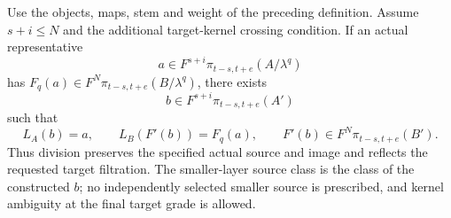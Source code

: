 \begin{theorem}
\label{sem:ProofTools:finite-lambda-division}
Use the objects, maps, stem and weight of the preceding definition. Assume $s+i\le N$ and the additional target-kernel crossing condition. If an actual representative
\[a\in F^{s+i}\pi_{t-s,t+e}(A/\lambda^q)\]
has $F_q(a)\in F^N\pi_{t-s,t+e}(B/\lambda^q)$, there exists
\[b\in F^{s+i}\pi_{t-s,t+e}(A')\]
such that
\[L_A(b)=a,\qquad L_B(F'(b))=F_q(a),\qquad F'(b)\in F^N\pi_{t-s,t+e}(B').\]
Thus division preserves the specified actual source and image and reflects the requested target filtration. The smaller-layer source class is the class of the constructed $b$; no independently selected smaller source is prescribed, and kernel ambiguity at the final target grade is allowed.
\end{theorem}
